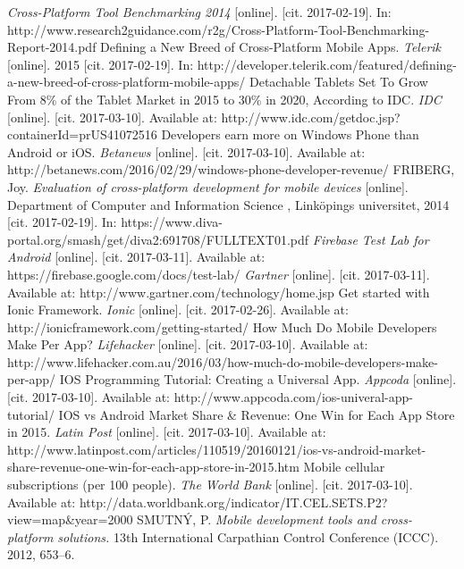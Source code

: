 \documentclass[english,master,public,dept460,male,cpdeclaration,oneside]{diploma}
\begin{document}
\begin{thebibliography}{99}
	 \textit{Cross-Platform Tool Benchmarking 2014} [online]. [cit. 2017-02-19]. In: http://www.research2guidance.com/r2g/Cross-Platform-Tool-Benchmarking-Report-2014.pdf
	 Defining a New Breed of Cross-Platform Mobile Apps. \textit{Telerik} [online]. 2015 [cit. 2017-02-19]. In: http://developer.telerik.com/featured/defining-a-new-breed-of-cross-platform-mobile-apps/
	 Detachable Tablets Set To Grow From 8\% of the Tablet Market in 2015 to 30\% in 2020, According to IDC. \textit{IDC} [online]. [cit. 2017-03-10]. Available at: http://www.idc.com/getdoc.jsp?containerId=prUS41072516
	 Developers earn more on Windows Phone than Android or iOS. \textit{Betanews} [online]. [cit. 2017-03-10]. Available at: http://betanews.com/2016/02/29/windows-phone-developer-revenue/
	 FRIBERG, Joy. \textit{Evaluation of cross-platform development for mobile devices} [online]. Department of Computer and Information Science , Linköpings universitet, 2014 [cit. 2017-02-19]. In: https://www.diva-portal.org/smash/get/diva2:691708/FULLTEXT01.pdf	
	 \textit{Firebase Test Lab for Android} [online]. [cit. 2017-03-11]. Available at: https://firebase.google.com/docs/test-lab/	
	 \textit{Gartner} [online]. [cit. 2017-03-11]. Available at: http://www.gartner.com/technology/home.jsp
	 Get started with Ionic Framework. \textit{Ionic} [online]. [cit. 2017-02-26]. Available at: http://ionicframework.com/getting-started/
	 How Much Do Mobile Developers Make Per App? \textit{Lifehacker} [online]. [cit. 2017-03-10]. Available at: http://www.lifehacker.com.au/2016/03/how-much-do-mobile-developers-make-per-app/
	 IOS Programming Tutorial: Creating a Universal App. \textit{Appcoda} [online]. [cit. 2017-03-10]. Available at: http://www.appcoda.com/ios-univeral-app-tutorial/
	 IOS vs Android Market Share \& Revenue: One Win for Each App Store in 2015. \textit{Latin Post} [online]. [cit. 2017-03-10]. Available at: http://www.latinpost.com/articles/110519/20160121/ios-vs-android-market-share-revenue-one-win-for-each-app-store-in-2015.htm
	 Mobile cellular subscriptions (per 100 people). \textit{The World Bank} [online]. [cit. 2017-03-10]. Available at: http://data.worldbank.org/indicator/IT.CEL.SETS.P2?view=map\&year=2000
	SMUTNÝ, P. \textit{Mobile development tools and cross-platform solutions.} 13th International Carpathian Control Conference (ICCC). 2012, 653–6.

\end{thebibliography}
\end{document}
